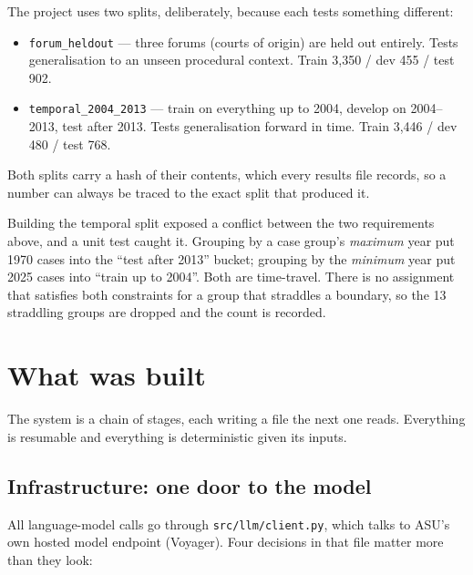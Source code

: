 \documentclass[12pt,a4paper]{article}
\newcommand{\code}[1]{\texttt{\small #1}}
\begin{document}
The project uses two splits, deliberately, because each tests something different:

\begin{itemize}
\item \code{forum\_heldout} --- three forums (courts of origin) are held out entirely. Tests
generalisation to an unseen procedural context. Train 3,350 / dev 455 / test 902.
\item \code{temporal\_2004\_2013} --- train on everything up to 2004, develop on 2004--2013, test
after 2013. Tests generalisation forward in time. Train 3,446 / dev 480 / test 768.
\end{itemize}

Both splits carry a hash of their contents, which every results file records, so a number can
always be traced to the exact split that produced it.

Building the temporal split exposed a conflict between the two requirements above, and a unit test
caught it. Grouping by a case group's \emph{maximum} year put 1970 cases into the ``test after
2013'' bucket; grouping by the \emph{minimum} year put 2025 cases into ``train up to 2004''. Both
are time-travel. There is no assignment that satisfies both constraints for a group that straddles
a boundary, so the 13 straddling groups are dropped and the count is recorded.

\section{What was built}\label{sec:pipeline}

The system is a chain of stages, each writing a file the next one reads. Everything is resumable
and everything is deterministic given its inputs.

\subsection{Infrastructure: one door to the model}

All language-model calls go through \code{src/llm/client.py}, which talks to ASU's own hosted model
endpoint (Voyager). Four decisions in that file matter more than they look:
\end{document}
